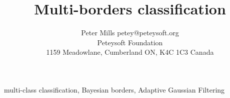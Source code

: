 \documentclass[twoside,11pt]{article}
\begin{document}
\title{Multi-borders classification}

\author{\name Peter Mills \email petey@peteysoft.org \\
       \addr Peteysoft Foundation\\
       1159 Meadowlane, Cumberland ON, K4C 1C3 Canada}

\editor{}

\maketitle

\begin{abstract}%

\end{abstract}

\begin{keywords}
multi-class classification, Bayesian borders, Adaptive Gaussian Filtering
\end{keywords}












\end{document}
